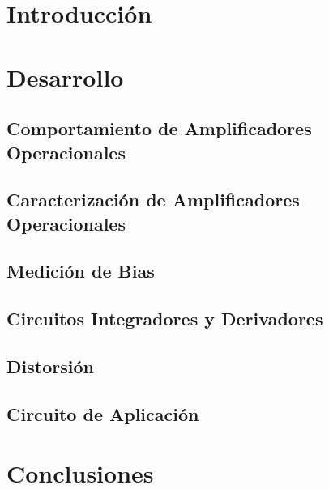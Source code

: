 







\section{Introducción}

\section{Desarrollo}

\subsection{Comportamiento de Amplificadores Operacionales}

	

\subsection{Caracterización de Amplificadores Operacionales}

	

\subsection{Medición de Bias}

	

\subsection{Circuitos Integradores y Derivadores}

	

\subsection{Distorsión}

	

\subsection{Circuito de Aplicación}

	

\section{Conclusiones}



